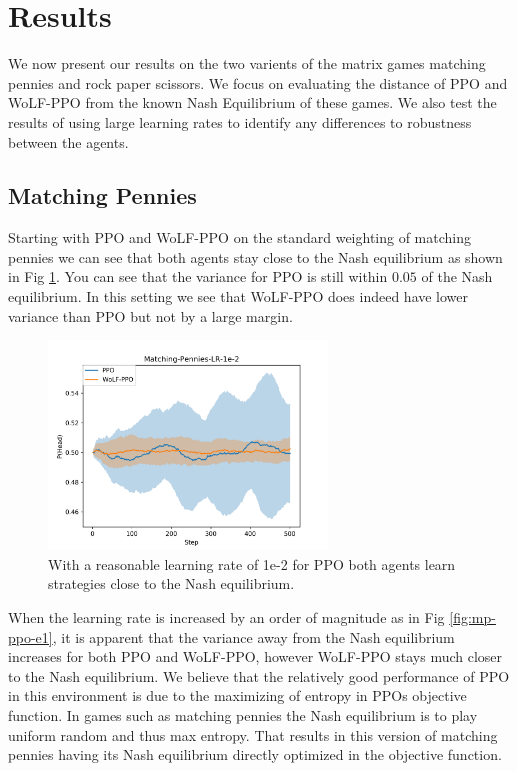 \documentclass[conference]{IEEEtran}
\begin{document}
\section{Results}

We now present our results on the two varients of the matrix games matching pennies and rock paper scissors. We focus on evaluating the distance of PPO and WoLF-PPO from the known Nash Equilibrium of these games. We also test the results of using large learning rates to identify any differences to robustness between the agents.

\subsection{Matching Pennies}

Starting with PPO and WoLF-PPO on the standard weighting of matching pennies we can see that both agents stay close to the Nash equilibrium as shown in Fig \ref{fig:mp-ppo-e2}. You can see that the variance for PPO is still within $0.05$ of the Nash equilibrium. In this setting we see that WoLF-PPO does indeed have lower variance than PPO but not by a large margin.

\begin{figure}
    \centering
    \includegraphics[width=20em]{Figures/matching-pennies-lr-1e-2.png}
    \caption{With a reasonable learning rate of 1e-2 for PPO both agents learn strategies close to the Nash equilibrium.}
    \label{fig:mp-ppo-e2}
\end{figure}

When the learning rate is increased by an order of magnitude as in Fig \ref{fig:mp-ppo-e1}, it is apparent that the variance away from the Nash equilibrium increases for both PPO and WoLF-PPO, however WoLF-PPO stays much closer to the Nash equilibrium. We believe that the relatively good performance of PPO in this environment is due to the maximizing of entropy in PPOs objective function. In games such as matching pennies the Nash equilibrium is to play uniform random and thus max entropy. That results in this version of matching pennies having its Nash equilibrium directly optimized in the objective function.
\end{document}
